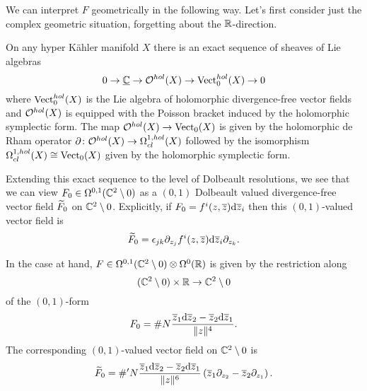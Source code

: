 \documentclass[11pt]{amsart}
\begin{document}
\parsec[]

We can interpret $F$ geometrically in the following way. 
Let's first consider just the complex geometric situation, forgetting about the $\mathbb R$-direction. 
 
On any hyper K\"ahler manifold $X$ there is an exact sequence of sheaves of Lie algebras
\[
0 \to \smash{\underline{\mathbb C}} \to \mathcal O^{hol}(X) \to {\rm Vect}_0^{hol} (X) \to 0
\]
where ${\rm Vect}^{hol}_0(X)$ is the Lie algebra of holomorphic divergence-free vector fields and $\mathcal O^{hol}(X)$ is equipped with the Poisson bracket induced by the holomorphic symplectic form. 
The map $\mathcal O^{hol}(X) \to {\rm Vect}_0(X)$ is given by the holomorphic de Rham operator $\partial \colon \mathcal O^{hol}(X) \to \Omega^{1,hol}_{cl}(X)$ followed by the isomorphism 
$\Omega^{1,hol}_{cl} (X) \cong {\rm Vect}_0(X)$ given by the holomorphic symplectic form. 

Extending this exact sequence to the level of Dolbeault resolutions, we see that we can view $F_0 \in \Omega^{0,1}(\mathbb C^2 \setminus 0)$ as a $(0,1)$ Dolbeault valued divergence-free vector field $\widetilde{F}_0$ on $\mathbb C^2 \setminus 0$. 
Explicitly, if $F_0 = f^i (z,\overline{z}) {\rm d} \overline{z}_i$ then this $(0,1)$-valued vector field is
\[
\widetilde{F}_0 = \epsilon_{jk} \partial_{z_j} f^i (z,\overline{z}) {\rm d} \overline{z}_i \partial_{z_k} .
\]

In the case at hand, $F \in \Omega^{0,1}(\mathbb C^2 \setminus 0) \otimes \Omega^0(\mathbb R)$ is given by the restriction along 
\[
(\mathbb C^2 \setminus 0) \times \mathbb R \to \mathbb C^2 \setminus 0
\]
of the $(0,1)$-form
\[
F_0 = \# N \frac{\overline{z}_1 {\rm d} \overline{z}_2 - \overline{z}_2 {\rm d} \overline{z}_1}{\|z\|^4} .
\] 
The corresponding $(0,1)$-valued vector field on $\mathbb C^2 \setminus 0$ is
\[
\widetilde{F}_0 = \#' N \frac{\overline{z}_1 {\rm d} \overline{z}_2 - \overline{z}_2 {\rm d} \overline{z}_1}{\|z\|^6} \left(\overline{z}_1 \partial_{z_2} - \overline{z}_2 \partial_{z_1}\right) .
\] 
\end{document}
